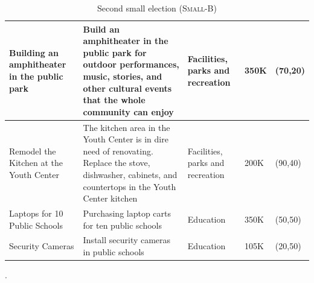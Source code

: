 \documentclass[letterpaper]{article} %
\begin{document}
\begin{table}[ht!]
\begin{center}
\begin{tabular}{|p{2cm}|p{8cm}|p{3cm}|p{1cm}|p{2cm}|}
    \hline
    Building an amphitheater in the public park & Build an amphitheater in the public park for outdoor performances, music, stories, and other cultural events that the whole community can enjoy & Facilities, parks and recreation & 350K & (70,20)\\
    \hline
    Remodel the Kitchen at the Youth Center & The kitchen area in the Youth Center is in dire need of renovating. Replace the stove, dishwasher, cabinets, and countertops in the Youth Center kitchen & Facilities, parks and recreation & 200K & (90,40)\\
    \hline
    Laptops for 10 Public Schools & Purchasing laptop carts for ten public schools & Education & 350K & (50,50)\\
    \hline
    Security Cameras & Install security cameras in public schools & Education & 105K & (20,50)\\
     \hline
    \end{tabular}
  \caption{Second small election (\textsc{Small-B})}\label{tab:second_elc}.
  \end{center}
\end{table}
\end{document}
